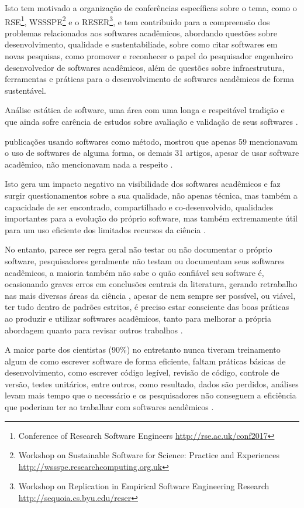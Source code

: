 Isto tem motivado a organização de conferências específicas sobre o tema, como
o RSE\footnote{Conference of Research Software Engineers
\url{http://rse.ac.uk/conf2017}}, WSSSPE\footnote{Workshop on Sustainable
Software for Science: Practice and Experiences
\url{http://wssspe.researchcomputing.org.uk}} e o RESER\footnote{Workshop on
Replication in Empirical Software Engineering Research
\url{http://sequoia.cs.byu.edu/reser}}, e tem contribuido para a compreensão
dos problemas relacionados aos softwares acadêmicos, abordando questões sobre
desenvolvimento, qualidade e sustentabiliade, sobre como citar softwares em
novas pesquisas, como promover e reconhecer o papel do pesquisador engenheiro
desenvolvedor de softwares acadêmicos, além de questões sobre infraestrutura,
ferramentas e práticas para o desenvolvimento de softwares acadêmicos de
forma sustentável.

Análise estática de software, uma área com uma longa e respeitável
tradição e que ainda sofre carência de estudos sobre avaliação e validação de
seus softwares \cite{li2010comparative, ilyas2016static}.

publicações usando softwares como método, mostrou que apenas 59 mencionavam o
uso de softwares de alguma forma, os demais 31 artigos, apesar de usar software
acadêmico, não mencionavam nada a respeito \cite{howison2016software}.

Isto gera um impacto negativo na visibilidade dos softwares acadêmicos e faz
surgir questionamentos sobre a sua qualidade, não apenas técnica, mas também a
capacidade de ser encontrado, compartilhado e co-desenvolvido, qualidades
importantes para a evolução do próprio software, mas também extremamente útil
para um uso eficiente dos limitados recursos da ciência \cite{howison2013incentives,
katz2014transitive}.

No entanto, parece ser regra geral não testar ou não documentar o próprio
software, pesquisadores geralmente não testam ou documentam seus softwares
acadêmicos, a maioria também não sabe o quão confiável seu software é,
ocasionando graves erros em conclusões centrais da literatura,
gerando retrabalho nas mais diversas áreas da ciência \cite{merali2010computational},
apesar de nem sempre ser possível, ou viável, ter tudo dentro de
padrões estritos, é preciso estar consciente das boas práticas ao
produzir e utilizar softwares acadêmicos, tanto para melhorar a própria
abordagem quanto para revisar outros trabalhos \cite{wilson2014best}.

A maior parte dos cientistas (90\%) no entretanto nunca tiveram treinamento
algum de como escrever software de forma eficiente, faltam práticas básicas de
desenvolvimento, como escrever código legível, revisão de código, controle de
versão, testes unitários, entre outros, como resultado, dados são perdidos,
análises levam mais tempo que o necessário e os pesquisadores não conseguem a
eficiência que poderiam ter ao trabalhar com softwares acadêmicos
\cite{wilson2017good}.

